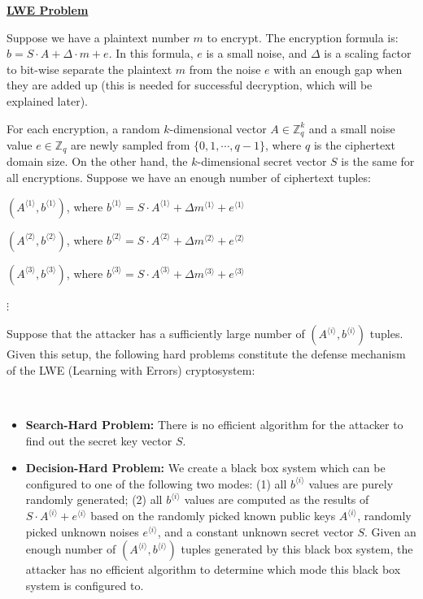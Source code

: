 \begin{tcolorbox}[title={\textbf{\tboxlabel{\ref*{subsec:lattice-overview}} The LWE (Learning with Errors) and RLWE Problems}}]
\textbf{\underline{LWE Problem}}

Suppose we have a plaintext number $m$ to encrypt. The encryption formula is: $b = S \cdot A + \Delta \cdot m + e$. In this formula, $e$ is a small noise, and $\Delta$ is a scaling factor to bit-wise separate the plaintext $m$ from the noise $e$ with an enough gap when they are added up (this is needed for successful decryption, which will be explained later). 

For each encryption, a random $k$-dimensional vector $A \in \mathbb{Z}_q^k$ and a small noise value $e \in \mathbb{Z}_q$ are newly sampled from $\{0, 1, \cdots, q - 1\}$, where $q$ is the ciphertext domain size. On the other hand, the $k$-dimensional secret vector $S$ is the same for all encryptions. Suppose we have an enough number of ciphertext tuples: 

$(A^{\langle 1 \rangle}, b^{\langle 1 \rangle})$, where $b^{\langle 1 \rangle} = S \cdot A^{\langle 1 \rangle} + \Delta m^{\langle 1 \rangle} + e^{\langle 1 \rangle}$ 

$(A^{\langle 2 \rangle}, b^{\langle 2 \rangle})$, where $b^{\langle 2 \rangle} = S \cdot A^{\langle 2 \rangle} + \Delta m^{\langle 2 \rangle} + e^{\langle 2 \rangle}$ 

$(A^{\langle 3 \rangle}, b^{\langle 3 \rangle})$, where $b^{\langle 3 \rangle} = S \cdot A^{\langle 3 \rangle} + \Delta m^{\langle 3 \rangle} + e^{\langle 3 \rangle}$ 

\text{ } $\vdots$

Suppose that the attacker has a sufficiently large number of $(A^{\langle i \rangle}, b^{\langle i \rangle})$ tuples. Given this setup, the following hard problems constitute the defense mechanism of the LWE (Learning with Errors) cryptosystem:

$ $

\begin{itemize}
\item \textbf{Search-Hard Problem:} There is no efficient algorithm for the attacker to find out the secret key vector $S$.
\item \textbf{Decision-Hard Problem:} We create a black box system which can be configured to one of the following two modes: (1) all $b^{\langle i\rangle}$ values are purely randomly generated; (2) all $b^{\langle i\rangle}$ values are computed as the results of $S \cdot A^{\langle i\rangle} + e^{\langle i\rangle}$ based on the randomly picked known public keys $A^{\langle i \rangle}$, randomly picked unknown noises $e^{\langle i\rangle}$, and a constant unknown secret vector $S$. Given an enough number of $(A^{\langle i \rangle}, b^{\langle i \rangle})$ tuples generated by this black box system, the attacker has no efficient algorithm to determine which mode this black box system is configured to.
\end{itemize}


\end{tcolorbox}
